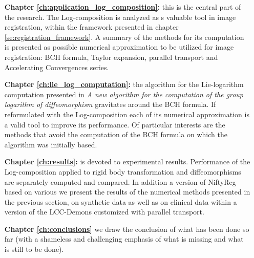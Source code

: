 \begin{enumerate}
	
    \item[{\bf Chapter \ref{ch:application_log_composition}:}] this is the central part of the research. The Log-composition is analyzed as s valuable tool in image registration, within the framework presented in chapter \ref{se:registration_framework}. A summary of the methods for its computation is presented as possible numerical approximation to be utilized for image registration: BCH formula, Taylor expansion, parallel transport and Accelerating Convergences series. 
    
    
     \item[{\bf Chapter \ref{ch:lie_log_computation}:}]  the algorithm for the Lie-logarithm computation presented in \emph{A new algorithm for the computation of the group logarithm of diffeomorphism} \cite{Bossa:08} gravitates around the BCH formula. If reformulated with the Log-composition each of its numerical approximation is a valid tool to improve its performance. Of particular interests are the methods that avoid the computation of the BCH formula on which the algorithm was initially based.
     
	\item[{\bf Chapter \ref{ch:results}:}] is devoted to experimental results. Performance of the Log-composition applied to rigid body transformation and diffeomorphisms are separately computed and compared. In addition a version of NiftyReg based on various we present the results of the numerical methods presented in the previous section, on synthetic data as well as on clinical data within a version of the  LCC-Demons customized with parallel transport.
	
	
	\item[{\bf Chapter \ref{ch:conclusions}}] we draw the conclusion of what has been done so far (with a shameless and challenging emphasis of what is missing and what is still to be done).

	
	
\end{enumerate}








